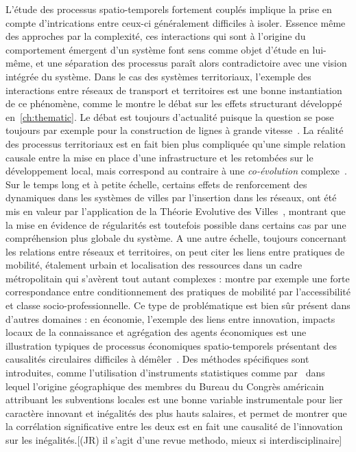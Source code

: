 {
L'étude des processus spatio-temporels fortement couplés implique la prise en compte d'intrications entre ceux-ci généralement difficiles à isoler. Essence même des approches par la complexité, ces interactions qui sont à l'origine du comportement émergent d'un système font sens comme objet d'étude en lui-même, et une séparation des processus paraît alors contradictoire avec une vision intégrée du système. Dans le cas des systèmes territoriaux, l'exemple des interactions entre réseaux de transport et territoires est une bonne instantiation de ce phénomène, comme le montre le débat sur les effets structurant développé en~\ref{ch:thematic}. Le débat est toujours d'actualité puisque la question se pose toujours par exemple pour la construction de lignes à grande vitesse~\cite{crozethalshs01094554}. La réalité des processus territoriaux est en fait bien plus compliquée qu'une simple relation causale entre la mise en place d'une infrastructure et les retombées sur le développement local, mais correspond au contraire à une \emph{co-évolution} complexe~\cite{bretagnolletel00459720}. Sur le temps long et à petite échelle, certains effets de renforcement des dynamiques dans les systèmes de villes par l'insertion dans les réseaux, ont été mis en valeur par l'application de la Théorie Evolutive des Villes~\cite{espacegeo2014effets}, montrant que la mise en évidence de régularités est toutefois possible dans certains cas par une compréhension plus globale du système. A une autre échelle, toujours concernant les relations entre réseaux et territoires, on peut citer les liens entre pratiques de mobilité, étalement urbain et localisation des ressources dans un cadre métropolitain qui s'avèrent tout autant complexes : \cite{cerqueira2017inegalites} montre par exemple une forte correspondance entre conditionnement des pratiques de mobilité par l'accessibilité et classe socio-professionnelle. Ce type de problématique est bien sûr présent dans d'autres domaines : en économie, l'exemple des liens entre innovation, impacts locaux de la connaissance et agrégation des agents économiques est une illustration typiques de processus économiques spatio-temporels présentant des causalités circulaires difficiles à démêler~\cite{audretsch1996r}. Des méthodes spécifiques sont introduites, comme l'utilisation d'instruments statistiques comme par~\cite{aghion2015innovation} dans lequel l'origine géographique des membres du Bureau du Congrès américain attribuant les subventions locales est une bonne variable instrumentale pour lier caractère innovant et inégalités des plus hauts salaires, et permet de montrer que la corrélation significative entre les deux est en fait une causalité de l'innovation sur les inégalités.[(JR) il s'agit d'une revue methodo, mieux si interdisciplinaire] 
}


